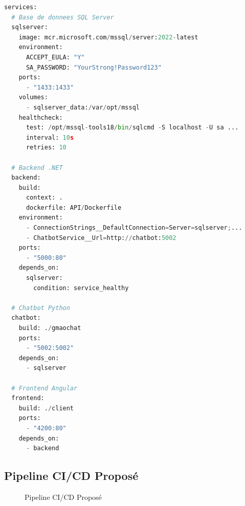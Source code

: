\documentclass[12pt,a4paper]{article}
\begin{document}
\begin{lstlisting}[language=Python, caption=docker-compose.yml - Services]
services:
  # Base de donnees SQL Server
  sqlserver:
    image: mcr.microsoft.com/mssql/server:2022-latest
    environment:
      ACCEPT_EULA: "Y"
      SA_PASSWORD: "YourStrong!Password123"
    ports:
      - "1433:1433"
    volumes:
      - sqlserver_data:/var/opt/mssql
    healthcheck:
      test: /opt/mssql-tools18/bin/sqlcmd -S localhost -U sa ...
      interval: 10s
      retries: 10

  # Backend .NET
  backend:
    build:
      context: .
      dockerfile: API/Dockerfile
    environment:
      - ConnectionStrings__DefaultConnection=Server=sqlserver;...
      - ChatbotService__Url=http://chatbot:5002
    ports:
      - "5000:80"
    depends_on:
      sqlserver:
        condition: service_healthy

  # Chatbot Python
  chatbot:
    build: ./gmaochat
    ports:
      - "5002:5002"
    depends_on:
      - sqlserver

  # Frontend Angular
  frontend:
    build: ./client
    ports:
      - "4200:80"
    depends_on:
      - backend
\end{lstlisting}

\subsection{Pipeline CI/CD Proposé}

\begin{figure}[H]
\centering
{}
\caption{Pipeline CI/CD Proposé}
\end{figure}
\end{document}
